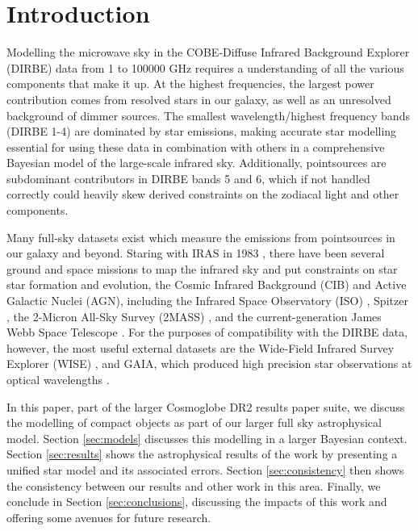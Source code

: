 \documentclass{aa}
\begin{document}
\section{Introduction}

Modelling the microwave sky in the COBE-Diffuse Infrared Background Explorer (DIRBE) data  \citep{DIRBE} from 1 to 100000 GHz requires a  understanding of all the various components that make it up. At the highest frequencies, the largest power contribution comes from resolved stars in our galaxy, as well as an unresolved background of dimmer sources. The smallest wavelength/highest frequency bands (DIRBE 1-4) are dominated by star emissions, making accurate star modelling essential for using these data in combination with others in a comprehensive Bayesian model of the large-scale infrared sky. Additionally, pointsources are subdominant contributors in DIRBE bands 5 and 6, which if not handled correctly could heavily skew derived constraints on the zodiacal light and other components.

Many full-sky datasets exist which measure the emissions from pointsources in our galaxy and beyond. Staring with IRAS in 1983 \citep{iras}, there have been several ground and space missions to map the infrared sky and put constraints on star star formation and evolution, the Cosmic Infrared Background (CIB) and Active Galactic Nuclei (AGN), including the Infrared Space Observatory (ISO) \citep{iso}, Spitzer \citep{spitzer}, the 2-Micron All-Sky Survey (2MASS) \citep{2mass}, and the current-generation James Webb Space Telescope \citep{jwst}. For the purposes of compatibility with the DIRBE data, however, the most useful external datasets are the Wide-Field Infrared Survey Explorer (WISE) \citep{wise}, and GAIA, which produced high precision star observations at optical wavelengths \citep{gaia, gaia2}. 

In this paper, part of the larger Cosmoglobe DR2 results paper suite, we discuss the modelling of compact objects as part of our larger full sky astrophysical model. Section \ref{sec:models} discusses this modelling in a larger Bayesian context. Section \ref{sec:results} shows the astrophysical results of the work by presenting a unified star model and its associated errors. Section \ref{sec:consistency} then shows the consistency between our results and other work in this area. Finally, we conclude in Section \ref{sec:conclusions}, discussing the impacts of this work and offering some avenues for future research.
\end{document}

